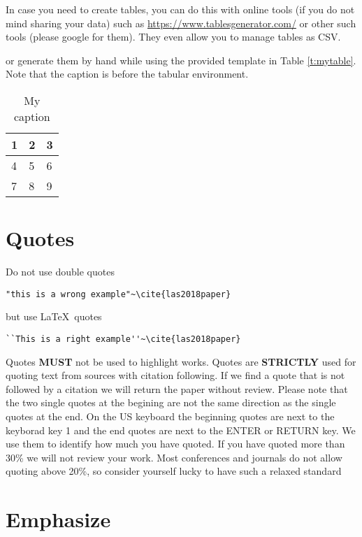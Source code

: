 In case you need to create tables, you can do this with online tools
(if you do not mind sharing your data) such as
\url{https://www.tablesgenerator.com/} or other such tools (please
google for them). They even allow you to manage tables as CSV.

or generate them by hand while using the provided template in Table
\ref{t:mytable}. Note that
the caption is before the tabular environment.

\begin{table}[htb]
\centering
\caption{My caption}
\label{t:mytabble}
\begin{tabular}{lll}
1 & 2 & 3 \\
\toprule
4 & 5 & 6 \\
7 & 8 & 9
\end{tabular}
\end{table}

\section{Quotes}

Do not use double quotes 

\begin{verbatim}
"this is a wrong example"~\cite{las2018paper} 
\end{verbatim}

but use \LaTeX\ quotes

\begin{verbatim}
``This is a right example''~\cite{las2018paper}
\end{verbatim}


Quotes {\bf MUST} not be used to highlight works. Quotes are {\bf
  STRICTLY} used for quoting text from sources with citation
following. If we find a quote that is not followed by a citation we
will return the paper without review. Please note that the two single
quotes at the begining are not the same direction as the single quotes
at the end. On the US keyboard the beginning quotes are next to the
keyborad key 1 and the end quotes are next to the ENTER or RETURN
key. We use them to identify how much you have quoted. If you have
quoted more than 30\% we will not review your work. Most conferences
and journals do not allow quoting above 20\%, so consider yourself
lucky to have such a relaxed standard

\section{Emphasize}

